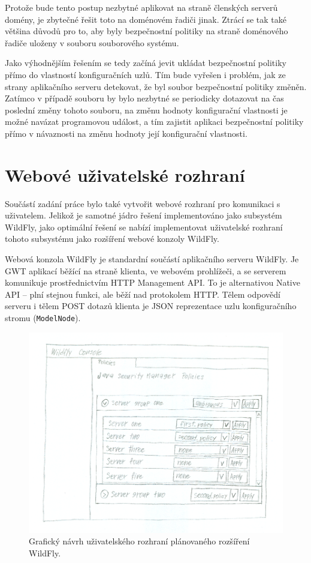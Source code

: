Protože bude tento postup nezbytné aplikovat na straně členských serverů domény, je zbytečné řešit toto na doménovém řadiči jinak. Ztrácí se tak také většina důvodů pro to, aby byly bezpečnostní politiky na straně doménového řadiče uloženy v souboru souborového systému.

Jako výhodnějším řešením se tedy začíná jevit ukládat bezpečnostní politiky přímo do vlastností konfiguračních uzlů. Tím bude vyřešen i problém, jak ze strany aplikačního serveru detekovat, že byl soubor bezpečnostní politiky změněn. Zatímco v případě souboru by bylo nezbytné se periodicky dotazovat na čas poslední změny tohoto souboru, na změnu hodnoty konfigurační vlastnosti je možné navázat programovou událost, a tím zajistit aplikaci bezpečnostní politiky přímo v návaznosti na změnu hodnoty její konfigurační vlastnosti.

\section{Webové uživatelské rozhraní} \label{navrhGUI}

Součástí zadání práce bylo také vytvořit webové rozhraní pro komunikaci s uživatelem. Jelikož je samotné jádro řešení implementováno jako subsystém WildFly, jako optimální řešení se nabízí implementovat uživatelské rozhraní tohoto subsystému jako rozšíření webové konzoly WildFly.

Webová konzola WildFly je standardní součástí aplikačního serveru WildFly. Je GWT aplikací běžící na straně klienta, ve webovém prohlížeči, a se serverem komunikuje prostřednictvím HTTP Management API. To je alternativou Native API -- plní stejnou funkci, ale běží nad protokolem HTTP. Tělem odpovědí serveru i tělem POST dotazů klienta je JSON reprezentace uzlu konfiguračního stromu ({\tt ModelNode}). \cite{WildFlyManagementAPIreference}

\begin{figure}[ht]
  \centering
  \includegraphics[width=14cm]{fig/mockup}
  \caption{Grafický návrh uživatelského rozhraní plánovaného rozšíření WildFly.}
\end{figure}


